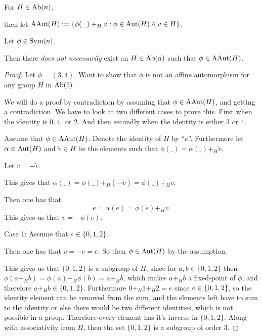 \begin{definition} \label{def:abelian-aaut}
    For \( H \in \operatorname{Ab}(n) \),

    then let \( \operatorname{AAut}(H) := \left\{ \phi(\_) +_H v : \phi \in \operatorname{Aut}(H) \land v \in H \right\} \).
\end{definition}

\begin{counterexample} \label{counterexample:ab-aaut}
    Let \( \phi \in \operatorname{Sym}(n) \).

    Then there \emph{does not necessarily} exist an \( H \in \operatorname{Ab}(n) \) such that \( \phi \in \operatorname{AAut}(H) \).
\end{counterexample}
\begin{proof} %
    Let \( \phi = (3, 4) \). Want to show that \( \phi \) is not an affine automorphism for any group \( H \) in \( \operatorname{Ab}(5) \).

    We will do a proof by contradiction by assuming that \( \phi \in \operatorname{AAut}(H) \), and getting a contradiction. We have to look at two different cases to prove this. First when the identity is \( 0, 1, \) or  \( 2 \). And then secondly when the identity is either \( 3 \) or \( 4 \).

    Assume that \( \phi \in \operatorname{AAut}(H) \). Denote the identity of \( H \) by ``\( e \)''. Furthermore let \( \alpha \in \operatorname{Aut}(H) \) and \( \tilde{v} \in H \) be the elements such that \( \phi(\_) = \alpha(\_) +_H \tilde{v} \).

    Let \( v = -\tilde{v} \).

    This gives that \( \alpha(\_) = \phi(\_) +_H (-\tilde{v}) = \phi(\_) +_H v \).

    Then one has that
    \[
        e = \alpha(e) = \phi(e) +_H v.
    \]
    This gives us that \( v = -\phi(e) \).

    Case 1: Assume that \( e \in \{ 0, 1, 2 \} \).

    Then one has that \( v = -e = e \). So then \( \phi \in \operatorname{Aut}(H) \) by the assumption. 
    
    This gives us that \( \{0, 1, 2\} \) is a subgroup of \( H \), since for \( a, b \in \{0, 1, 2 \} \) then \( \phi(a +_H b) = \phi(a) +_H \phi(b) = a +_H b \), which makes \( a +_H b \) a fixed-point of \( \phi \), and therefore \( a +_H b \in \{0, 1, 2 \} \). Furthermore \( 0 +_H 1 +_H 2 = e \) since \( e \in \left\{ 0, 1, 2 \right\} \), so the identity element can be removed from the sum, and the elements left have to sum to the identity or else there would be two different identities, which is not possible in a group. Therefore every element has it's inverse in \( \{0, 1, 2 \} \). Along with associativity from \( H \), then the set \( \{0, 1, 2 \} \) is a subgroup of order \( 3 \).


\end{proof}
